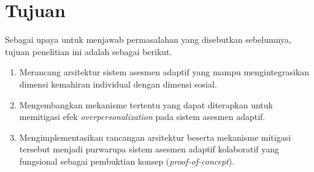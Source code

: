 \section{Tujuan}
\label{sec:tujuan}
Sebagai upaya untuk menjawab permasalahan yang disebutkan sebelumnya, tujuan penelitian ini adalah sebagai berikut.
\begin{enumerate}
  \item Merancang arsitektur sistem asesmen adaptif yang mampu mengintegrasikan dimensi kemahiran individual dengan dimensi sosial.
  \item Mengembangkan mekanisme tertentu yang dapat diterapkan untuk memitigasi efek \textit{overpersonalization} pada sistem asesmen adaptif.
  \item Mengimplementasikan rancangan arsitektur beserta mekanisme mitigasi tersebut menjadi purwarupa sistem asesmen adaptif kolaboratif yang fungsional sebagai pembuktian konsep (\textit{proof-of-concept}).
\end{enumerate}



